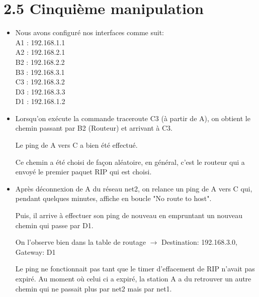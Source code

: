 \documentclass{article}
\begin{document}
\section*{2.5 Cinquième manipulation}

\begin{itemize}\renewcommand{\labelitemi}{$\bullet$}
\item Nous avons configuré nos interfaces comme suit:\\

A1 : 192.168.1.1\\

A2 : 192.168.2.1\\

B2 : 192.168.2.2\\

B3 : 192.168.3.1\\

C3 : 192.168.3.2\\

D3 : 192.168.3.3\\

D1 : 192.168.1.2\\

\item Lorsqu'on exécute la commande traceroute C3 (à partir de A), on obtient le chemin passant par B2 (Routeur) et arrivant à C3.

Le ping de A vers C a bien été effectué.

Ce chemin a été choisi de façon aléatoire, en général, c'est le routeur qui a envoyé le premier paquet RIP qui est choisi.

\item Après déconnexion de A du réseau net2, on relance un ping de A vers C qui, pendant quelques minutes, affiche en boucle "No route to host".

Puis, il arrive à effectuer son ping de nouveau en empruntant un nouveau chemin qui passe par D1. 

On l'observe bien dans la table de routage $\rightarrow$ Destination: 192.168.3.0, Gateway: D1

Le ping ne fonctionnait pas tant que le timer d'effacement de RIP n'avait pas expiré. Au moment où celui ci a expiré, la station A a du retrouver un autre chemin qui ne passait plus par net2 mais par net1.\\
\end{itemize}
\end{document}
